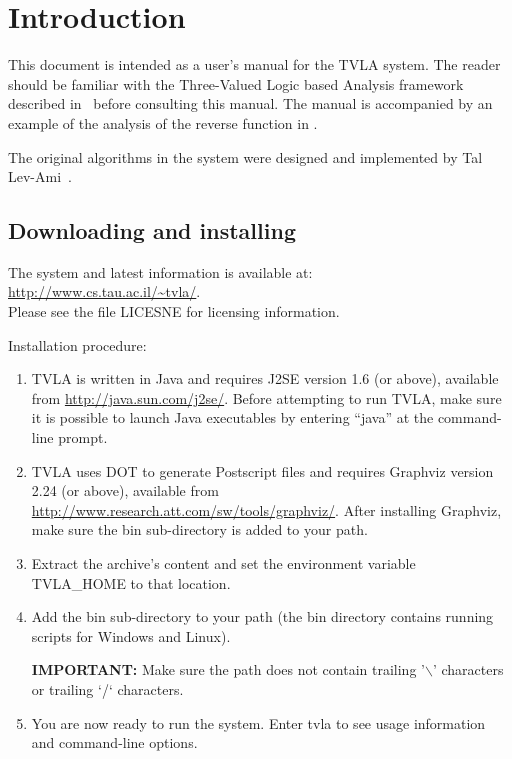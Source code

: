 \section{Introduction}

This document is intended as a user's manual for the TVLA system.
The reader should be familiar with the Three-Valued Logic based
Analysis framework described in~\cite{TOPLAS:SRW02} before
consulting this manual.  The manual is accompanied by an example
of the analysis of the reverse function in .

The original algorithms in the system were designed and implemented
by Tal Lev-Ami~\cite{kn:TalSAS00,Master:LevAmi00}.

\subsection{Downloading and installing}

The system and latest information is available at:\\
\url{http://www.cs.tau.ac.il/~tvla/}.\\
Please see the file LICESNE for licensing information.

Installation procedure:
\begin{enumerate}
\item TVLA is written in Java and requires J2SE version 1.6 (or
above), available from \url{http://java.sun.com/j2se/}. Before
attempting to run TVLA, make sure it is possible to launch Java
executables by entering ``java'' at the command-line prompt.

\item TVLA uses DOT to generate Postscript files and requires
Graphviz version 2.24 (or above), available from\\
\url{http://www.research.att.com/sw/tools/graphviz/}.  After
installing Graphviz, make sure the bin sub-directory is added to
your path.

\item Extract the archive's content and set the environment
variable TVLA\_HOME to that location.

\item Add the bin sub-directory to your path (the bin directory
contains running scripts for Windows and Linux).

\textbf{IMPORTANT:} Make sure the path does not contain trailing
'$\backslash$' characters or trailing `/` characters.

\item You are now ready to run the system.  Enter tvla to see
usage information and command-line options.
\end{enumerate}

